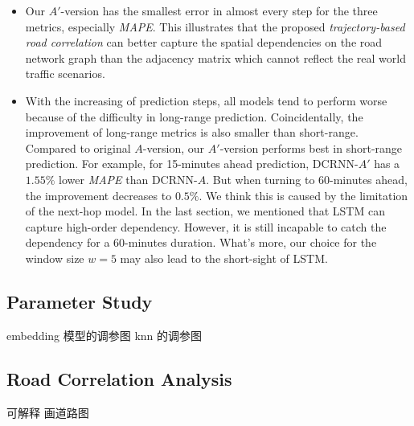 \begin{table}[htb]
\begin{center}
{\begin{tabular}{c|c|ccc|ccc|ccc}
                \bottomrule
            \end{tabular}
        }
    \end{center}
\end{table}

\begin{itemize}
    \item Our $A'$-version has the smallest error in almost every step for the three metrics, especially \textit{MAPE}. This illustrates that the proposed \textit{trajectory-based road correlation} can better capture the spatial dependencies on the road network graph than the adjacency matrix which cannot reflect the real world traffic scenarios.
    \item With the increasing of prediction steps, all models tend to perform worse because of the difficulty in long-range prediction. Coincidentally, the improvement of long-range metrics is also smaller than short-range. Compared to original $A$-version, our $A'$-version performs best in short-range prediction. For example, for 15-minutes ahead prediction, DCRNN-$A'$ has a $1.55\%$ lower \textit{MAPE} than DCRNN-$A$. But when turning to 60-minutes ahead, the improvement decreases to $0.5\%$. We think this is caused by the limitation of the next-hop model. In the last section, we mentioned that LSTM can capture high-order dependency. However, it is still incapable to catch the dependency for a 60-minutes duration. What's more, our choice for the window size $w=5$ may also lead to the short-sight of LSTM.
\end{itemize}

\subsection{Parameter Study}
embedding 模型的调参图
knn 的调参图

\subsection{Road Correlation Analysis}
可解释
画道路图
